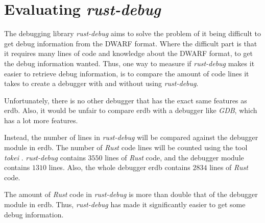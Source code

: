 
\section{Evaluating \emph{rust-debug}} \label{sec:evalrd}
The debugging library \emph{rust-debug} aims to solve the problem of it being difficult to get debug information from the \gls{DWARF} format.
Where the difficult part is that it requires many lines of code and knowledge about the \gls{DWARF} format, to get the debug information wanted.
Thus, one way to measure if \emph{rust-debug} makes it easier to retrieve debug information, is to compare the amount of code lines it takes to create a debugger with and without using \emph{rust-debug}.


Unfortunately, there is no other debugger that has the exact same features as \gls{erdb}.
Also, it would be unfair to compare \gls{erdb} with a debugger like \emph{GDB}, which has a lot more features.


Instead, the number of lines in \emph{rust-debug} will be compared against the debugger module in \gls{erdb}.
The number of \emph{Rust} code lines will be counted using the tool \emph{tokei} \cite{tokei}.
\emph{rust-debug} contains $3550$ lines of \emph{Rust} code, and the debugger module contains $1310$ lines.
Also, the whole debugger \gls{erdb} contains $2834$ lines of \emph{Rust} code.


The amount of \emph{Rust} code in \emph{rust-debug} is more than double that of the debugger module in \gls{erdb}.
Thus, \emph{rust-debug} has made it significantly easier to get some debug information.



